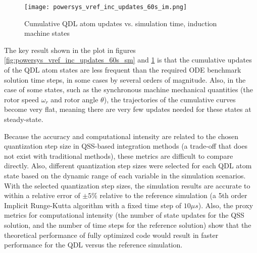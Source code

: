 \begin{figure}[h]
    \centering
    \texttt{[image: powersys\_vref\_inc\_updates\_60s\_im.png]}
    \caption{Cumulative QDL atom updates vs. simulation time, induction machine states}
    \label{fig:powersys_vref_inc_updates_60s_im}
\end{figure} 

The key result shown in the plot in figures \ref{fig:powersys_vref_inc_updates_60s_sm} and \ref{fig:powersys_vref_inc_updates_60s_im} is that the cumulative updates of the QDL atom states are less frequent than the required ODE benchmark solution time steps, in some cases by several orders of magnitude. Also, in the case of some states, such as the synchronous machine mechanical quantities (the rotor speed $\omega_r$ and rotor angle $\theta$), the trajectories of the cumulative curves become very flat, meaning there are very few updates needed for these states at steady-state.

Because the accuracy and computational intensity are related to the chosen quantization step size in QSS-based integration methods (a trade-off that does not exist with traditional methods), these metrics are difficult to compare directly. Also, different quantization step sizes were selected for each QDL atom state based on the dynamic range of each variable in the simulation scenarios. With the selected quantization step sizes, the simulation results are accurate to within a relative error of $\pm 5\%$ relative to the reference simulation (a 5th order Implicit Runge-Kutta algorithm with a fixed time step of $10 \mu s$). Also, the proxy metrics for computational intensity (the number of state updates for the QSS solution, and the number of time steps for the reference solution) show that the theoretical performance of fully optimized code would result in faster performance for the QDL versus the reference simulation.